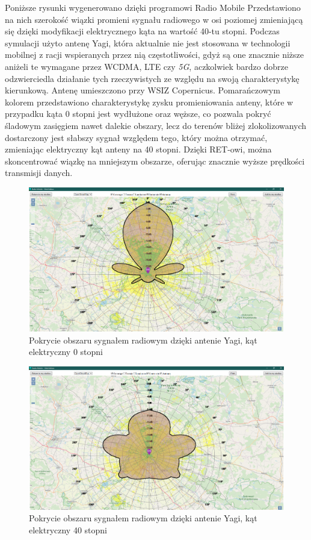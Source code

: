 		Poniższe rysunki wygenerowano dzięki programowi Radio Mobile 
		Przedstawiono na nich szerokość wiązki promieni sygnału radiowego w osi poziomej
		zmieniającą się dzięki modyfikacji elektrycznego kąta na wartość 40-tu stopni.
		Podczas symulacji użyto antenę Yagi, która aktualnie nie jest stosowana w technologii mobilnej z racji wspieranych
		przez nią częstotliwości, gdyż są one znacznie niższe aniżeli te wymagane przez WCDMA, LTE czy \textit{5G}, 
		aczkolwiek bardzo dobrze odzwierciedla działanie tych rzeczywistych ze względu na swoją charakterystykę kierunkową.
		\newline
		Antenę umieszczono przy WSIZ Copernicus. \newline
		Pomarańczowym kolorem przedstawiono charakterystykę zysku promieniowania anteny, które w przypadku kąta 0 stopni jest wydłużone oraz węższe,
		co pozwala pokryć śladowym zasięgiem nawet dalekie obszary, lecz do terenów bliżej zlokolizowanych dostarczony
		jest słabszy sygnał względem tego, który można otrzymać, zmieniając elektryczny kąt anteny na 40 stopni.
		Dzięki RET-owi, można skoncentrować wiązkę na mniejszym obszarze, oferując znacznie wyższe prędkości transmisji danych.

		\begin{figure}[h!]
		\centering
		\includegraphics[scale=0.5]{Obrazki/Antenna_Yagi_Angle_0.png}
		\caption{Pokrycie obszaru sygnałem radiowym dzięki antenie Yagi, kąt elektryczny 0 stopni}
		\end{figure}

		\begin{figure}[h!]
		\centering
		\includegraphics[scale=0.5]{Obrazki/Antenna_Yagi_Angle_40.png}
		\caption{Pokrycie obszaru sygnałem radiowym dzięki antenie Yagi, kąt elektryczny 40 stopni}
		\end{figure}

